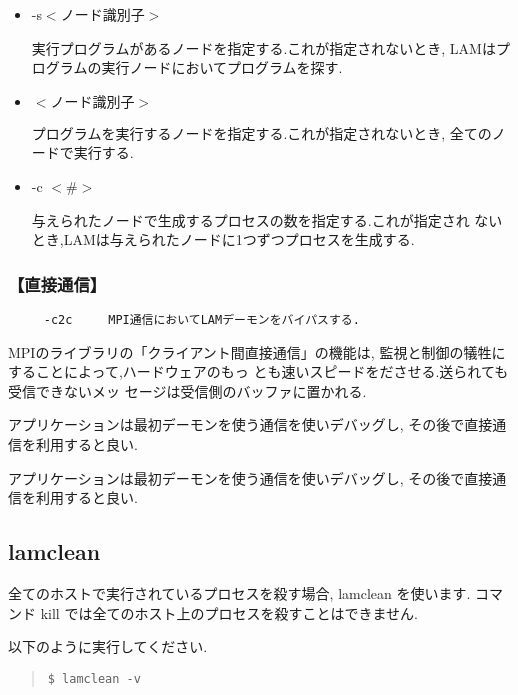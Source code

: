 \documentclass[a4paper,titlepage]{jreport}
\begin{document}
\begin{itemize}
\item -s$<ノード識別子>$

     実行プログラムがあるノードを指定する.これが指定されないとき,
     LAMはプログラムの実行ノードにおいてプログラムを探す.

\item $<ノード識別子>$

     プログラムを実行するノードを指定する.これが指定されないとき,
     全てのノードで実行する.

\item -c $< \# >$

     与えられたノードで生成するプロセスの数を指定する.これが指定され
     ないとき,LAMは与えられたノードに1つずつプロセスを生成する.
\end{itemize}

\subsubsection{【直接通信】}

\begin{verbatim}
     -c2c     MPI通信においてLAMデーモンをバイパスする.
\end{verbatim}

MPIのライブラリの「クライアント間直接通信」の機能は,
監視と制御の犠牲にすることによって,ハードウェアのもっ
とも速いスピードをださせる.送られても受信できないメッ
セージは受信側のバッファに置かれる.

アプリケーションは最初デーモンを使う通信を使いデバッグし,
その後で直接通信を利用すると良い.


アプリケーションは最初デーモンを使う通信を使いデバッグし,
その後で直接通信を利用すると良い.

\subsection{lamclean}
全てのホストで実行されているプロセスを殺す場合, lamclean を使います.
コマンド kill では全てのホスト上のプロセスを殺すことはできません.

以下のように実行してください.

\begin{quote}
\begin{screen}
\begin{verbatim}
$ lamclean -v
\end{verbatim}
\end{screen}
\end{quote}
\end{document}

